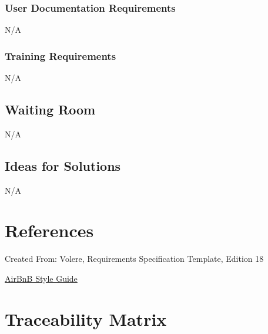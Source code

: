 \documentclass[12pt]{article}
\begin{document}
\subsubsection{User Documentation Requirements}
N/A

\subsubsection{Training Requirements}
N/A

\subsection{Waiting Room}
N/A

\subsection{Ideas for Solutions}
N/A

\section{References}
Created From: Volere, Requirements Specification Template, Edition 18

\noindent
\hyperref{https://github.com/airbnb/javascript}{}{}{AirBnB Style Guide}
\section{Traceability Matrix}
\end{document}
